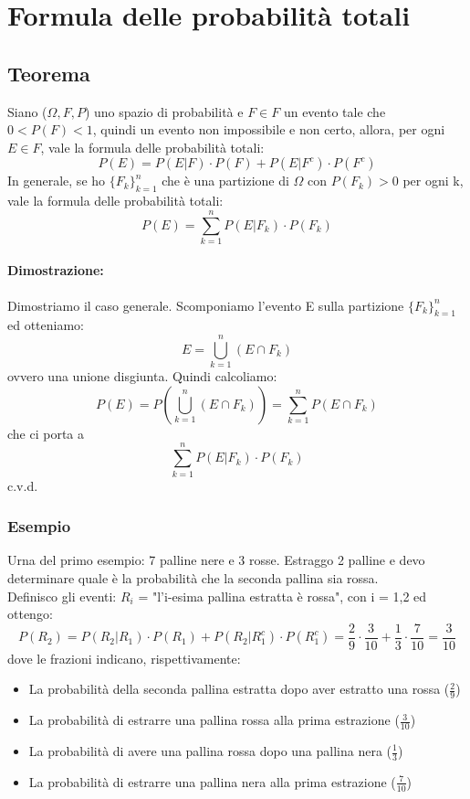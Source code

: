 \documentclass{report}
\begin{document}
\section{Formula delle probabilità totali}
\subsection{Teorema}
Siano (\(\Omega, \textit{F}, P\)) uno spazio di probabilità e \(F \in \textit{F}\) un evento tale che \(0 < P(F) < 1\), quindi un evento non impossibile e non certo, allora, per ogni \(E \in \textit{F}\), vale la formula delle probabilità totali: \[P(E) = P(E|F)\cdot P(F) + P(E|F^c)\cdot P(F^c)\] In generale, se ho \(\{F_k\}^n_{k = 1}\) che è una partizione di \(\Omega\) con \(P(F_k) > 0\) per ogni k, vale la formula delle probabilità totali: \[P(E) = \sum^n_{k=1} P(E|F_k)\cdot P(F_k)\]
\paragraph{Dimostrazione:} Dimostriamo il caso generale. Scomponiamo l'evento E sulla partizione \(\{F_k\}^{n}_{k=1}\) ed otteniamo: \[E = \bigcup^{n}_{k=1} (E \cap F_k)\] ovvero una unione disgiunta. Quindi calcoliamo: \[P(E) = P(\bigcup^{n}_{k=1} (E \cap F_k)) = \sum^n_{k=1} P(E \cap F_k)\] che ci porta a \[\sum^n_{k=1} P(E|F_k)\cdot P(F_k)\] c.v.d.
\subsubsection{Esempio}
Urna del primo esempio: 7 palline nere e 3 rosse. Estraggo 2 palline e devo determinare quale è la probabilità che la seconda pallina sia rossa.\\
Definisco gli eventi: \(R_i\) = "l'i-esima pallina estratta è rossa", con i = 1,2 ed ottengo: \[P(R_2) = P(R_2|R_1)\cdot P(R_1) + P(R_2|R_1^c)\cdot P(R_1^c) = \frac{2}{9}\cdot \frac{3}{10} + \frac{1}{3}\cdot \frac{7}{10} = \frac{3}{10}\] dove le frazioni indicano, rispettivamente: \begin{itemize}
    \item La probabilità della seconda pallina estratta dopo aver estratto una rossa (\(\frac{2}{9}\))
    \item La probabilità di estrarre una pallina rossa alla prima estrazione (\(\frac{3}{10}\))
    \item La probabilità di avere una pallina rossa dopo una pallina nera (\(\frac{1}{3}\))
    \item La probabilità di estrarre una pallina nera alla prima estrazione (\(\frac{7}{10}\))
\end{itemize}
\end{document}
